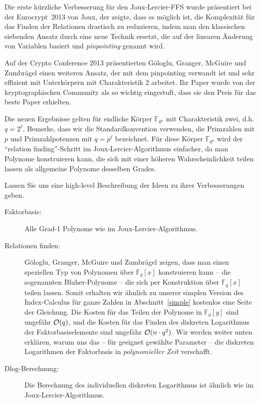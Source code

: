\begin{refsegment}
Die erste kürzliche Verbesserung für den Joux-Lercier-FFS wurde präsentiert bei der Eurocrypt~2013 von Joux, der zeigte, dass es möglich ist, die Komplexität für das Finden der Relationen drastisch zu reduzieren, indem man den klassischen siebenden Ansatz durch eine neue Technik ersetzt, die auf der linearen Änderung von Variablen basiert und {\it pinpointing} genannt wird.

\DIFaddend Auf der Crypto Conference 2013 präsentierten G\"ologlu, Granger, McGuire und Zumbr\"agel einen weiteren Ansatz, der mit dem pinpointing verwandt ist und sehr effizient mit Unterkörpern mit Charakteristik 2 arbeitet. Ihr Paper wurde von der kryptographischen Community als so wichtig eingestuft, dass sie den Preis für das beste Paper erhielten.

Die neuen Ergebnisse gelten für endliche Körper $\mathbb{F}_{q^n}$ mit Charakteristik zwei, d.h. $q=2^{\ell}$. Bemerke, dass wir die Standardkonvention verwenden, die Primzahlen mit $p$ und Primzahlpotenzen mit $q=p^{\ell}$ bezeichnet.
Für diese Körper $\mathbb{F}_{q^n}$ wird der "`relation finding"'-Schritt im Joux-Lercier-Algorithmus einfacher, da man Polynome konstruieren kann, die sich mit einer höheren Wahrscheinlichkeit teilen lassen als allgemeine Polynome desselben Grades.

Lassen Sie uns eine high-level Beschreibung der Ideen zu ihrer Verbesserungen geben.

\begin{description}
\item[Faktorbasis:] Alle Grad-1 Polynome wie im Joux-Lercier-Algorithmus.

\item[Relationen finden:] G\"ologlu, Granger, McGuire und Zumbr\"agel zeigen, dass man einen speziellen Typ von Polynomen über $\mathbb{F}_q[x]$ konstruieren kann -- die sogenannten Bluher-Polynome -- die sich per Konstruktion über $\mathbb{F}_q[x]$ teilen lassen. Somit erhalten wir ähnlich zu unserer simplen Version des Index-Calculus für ganze Zahlen in Abschnitt~\ref{simple} kostenlos eine Seite der Gleichung. Die Kosten für das Teilen der Polynome in $\mathbb{F}_q[y]$ sind ungefähr ${\cal O}(q)$, und die Kosten für das Finden des diskreten Logarithmus der Faktorbasiselemente sind ungefähr ${\cal O}(n \cdot q^2)$. Wir werden weiter unten erklären, warum uns das -- für geeignet gewählte Parameter -- die diskreten Logarithmen der Faktorbasis in {\em polynomieller Zeit} verschafft.

\item[Dlog-Berechnung:] Die Berechnung des individuellen diskreten Logarithmus ist ähnlich wie im Joux-Lercier-Algorithmus.
\end{description}


\end{refsegment}
